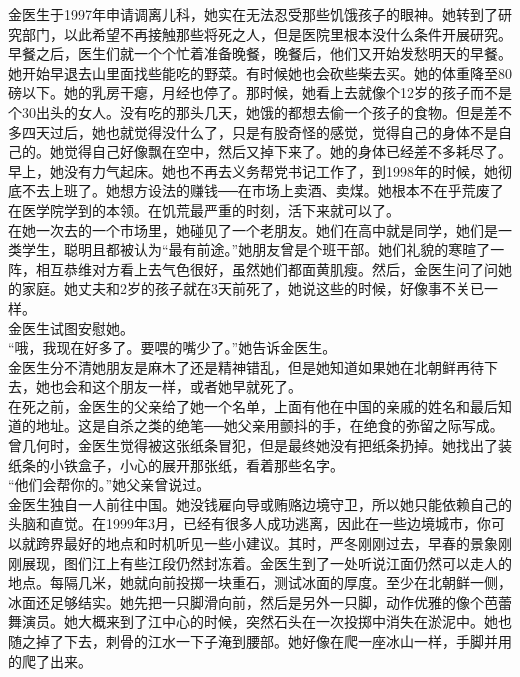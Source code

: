 金医生于1997年申请调离儿科，她实在无法忍受那些饥饿孩子的眼神。她转到了研究部门，以此希望不再接触那些将死之人，但是医院里根本没什么条件开展研究。早餐之后，医生们就一个个忙着准备晚餐，晚餐后，他们又开始发愁明天的早餐。她开始早退去山里面找些能吃的野菜。有时候她也会砍些柴去买。她的体重降至80磅以下。她的乳房干瘪，月经也停了。那时候，她看上去就像个12岁的孩子而不是个30出头的女人。没有吃的那头几天，她饿的都想去偷一个孩子的食物。但是差不多四天过后，她也就觉得没什么了，只是有股奇怪的感觉，觉得自己的身体不是自己的。她觉得自己好像飘在空中，然后又掉下来了。她的身体已经差不多耗尽了。早上，她没有力气起床。她也不再去义务帮党书记工作了，到1998年的时候，她彻底不去上班了。她想方设法的赚钱──在市场上卖酒、卖煤。她根本不在乎荒废了在医学院学到的本领。在饥荒最严重的时刻，活下来就可以了。\\

在她一次去的一个市场里，她碰见了一个老朋友。她们在高中就是同学，她们是一类学生，聪明且都被认为“最有前途。”她朋友曾是个班干部。她们礼貌的寒暄了一阵，相互恭维对方看上去气色很好，虽然她们都面黄肌瘦。然后，金医生问了问她的家庭。她丈夫和2岁的孩子就在3天前死了，她说这些的时候，好像事不关已一样。\\

金医生试图安慰她。\\

“哦，我现在好多了。要喂的嘴少了。”她告诉金医生。\\

金医生分不清她朋友是麻木了还是精神错乱，但是她知道如果她在北朝鲜再待下去，她也会和这个朋友一样，或者她早就死了。\\

在死之前，金医生的父亲给了她一个名单，上面有他在中国的亲戚的姓名和最后知道的地址。这是自杀之类的绝笔──她父亲用颤抖的手，在绝食的弥留之际写成。曾几何时，金医生觉得被这张纸条冒犯，但是最终她没有把纸条扔掉。她找出了装纸条的小铁盒子，小心的展开那张纸，看着那些名字。\\

“他们会帮你的。”她父亲曾说过。\\

金医生独自一人前往中国。她没钱雇向导或贿赂边境守卫，所以她只能依赖自己的头脑和直觉。在1999年3月，已经有很多人成功逃离，因此在一些边境城市，你可以就跨界最好的地点和时机听见一些小建议。其时，严冬刚刚过去，早春的景象刚刚展现，图们江上有些江段仍然封冻着。金医生到了一处听说江面仍然可以走人的地点。每隔几米，她就向前投掷一块重石，测试冰面的厚度。至少在北朝鲜一侧，冰面还足够结实。她先把一只脚滑向前，然后是另外一只脚，动作优雅的像个芭蕾舞演员。她大概来到了江中心的时候，突然石头在一次投掷中消失在淤泥中。她也随之掉了下去，刺骨的江水一下子淹到腰部。她好像在爬一座冰山一样，手脚并用的爬了出来。\\

